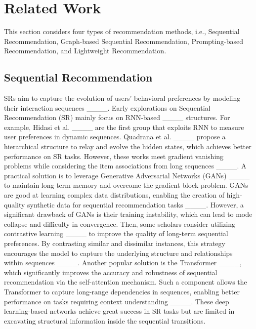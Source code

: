 \section{Related Work}
\noindent This section considers four types of recommendation methods, i.e., Sequential Recommendation, Graph-based Sequential Recommendation, Prompting-based Recommendation, and Lightweight Recommendation.


\subsection{Sequential Recommendation}
\noindent \acf{SRs} aim to capture the evolution of users' behavioral preferences by modeling their interaction sequences ____. Early explorations on Sequential Recommendation (SR) mainly focus on \ac{RNN}-based ____ structures. For example, Hidasi et al. ____ are the first group that exploits RNN to measure user preferences in dynamic sequences. Quadrana et al. ____ propose a hierarchical structure to relay and evolve the hidden states, which achieves better performance on \ac{SR} tasks. However, these works meet gradient vanishing problems while considering the item associations from long sequences ____.
A practical solution is to leverage Generative Adversarial Networks (GANs) ____ to maintain long-term memory and overcome the gradient block problem. GANs are good at learning complex data distributions, enabling the creation of high-quality synthetic data for sequential recommendation tasks ____. However, a significant drawback of GANs is their training instability, which can lead to mode collapse and difficulty in convergence. Then, some scholars consider utilizing contrastive learning ____ to improve the quality of long-term sequential preferences. By contrasting similar and dissimilar instances, this strategy encourages the model to capture the underlying structure and relationships within sequences ____. Another popular solution is the Transformer ____, which significantly improves the accuracy and robustness of sequential recommendation via the self-attention mechanism. Such a component allows the Transformer to capture long-range dependencies in sequences, enabling better performance on tasks requiring context understanding ____. These deep learning-based networks achieve great success in \ac{SR} tasks but are limited in excavating structural information inside the sequential transitions.

